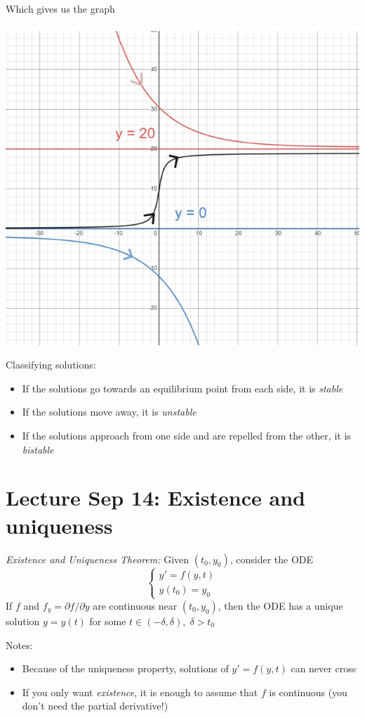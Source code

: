 \documentclass[12pt]{article}
\begin{document}
Which gives us the graph 

\includegraphics{Images/logistic graph.png}

Classifying solutions:
\begin{itemize}
    \item If the solutions go towards an equilibrium point from each side, it is \emph{stable}
    \item If the solutions move away, it is \emph{unstable}
    \item If the solutions approach from one side and are repelled from the other, it is \emph{bistable}
\end{itemize}

\section{Lecture Sep 14: Existence and uniqueness}
\emph{Existence and Uniqueness Theorem:}
Given $(t_0, y_0)$, consider the ODE 
\[\begin{cases}
    y' = f(y, t)\\
    y(t_0) = y_0
\end{cases}\]
If $f$ and $f_y = \partial f / \partial y$ are continuous near $(t_0, y_0)$, then the ODE has a unique solution $y = y(t)$ for some $t \in (-\delta, \delta), \; \delta > t_0$

Notes:
\begin{itemize}
    \item Because of the uniqueness property, solutions of $y' = f(y, t)$ can never cross
    \item If you only want \emph{existence}, it is enough to assume that $f$ is continuous (you don't need the partial derivative!) 
\end{itemize}
\end{document}
